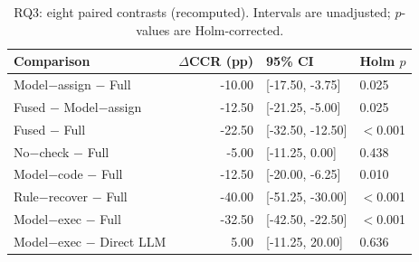 \begin{table}[!htbp]
\centering
\caption{RQ3: eight paired contrasts (recomputed). Intervals are unadjusted; $p$-values are Holm-corrected.}
\label{tab:rq3-attribution}
\footnotesize\setlength{\tabcolsep}{3pt}
\begin{tabular*}{\linewidth}{@{\extracolsep{\fill}}lrll@{}}
\toprule
Comparison & $\Delta$CCR (pp) & 95\% CI & Holm $p$ \\
\midrule
Model$-$assign $-$ Full & -10.00 & [-17.50, -3.75] & 0.025 & \\
Fused $-$ Model$-$assign & -12.50 & [-21.25, -5.00] & 0.025 & \\
Fused $-$ Full & -22.50 & [-32.50, -12.50] & $<$0.001 & \\
No$-$check $-$ Full & -5.00 & [-11.25, 0.00] & 0.438 & \\
Model$-$code $-$ Full & -12.50 & [-20.00, -6.25] & 0.010 & \\
Rule$-$recover $-$ Full & -40.00 & [-51.25, -30.00] & $<$0.001 & \\
Model$-$exec $-$ Full & -32.50 & [-42.50, -22.50] & $<$0.001 & \\
Model$-$exec $-$ Direct LLM & 5.00 & [-11.25, 20.00] & 0.636 & \\
\bottomrule
\end{tabular*}
\end{table}
